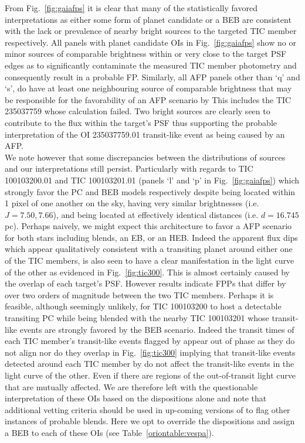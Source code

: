 From Fig.~\ref{fig:gaiafps} it is clear that many of the statistically favored interpretations as either 
some form of planet candidate or a BEB are consistent with the lack or prevalence of nearby bright sources
to the targeted TIC member respectively.
All panels with planet candidate OIs in Fig.~\ref{fig:gaiafps} show no
or minor sources of comparable brightness within or very close to the target PSF edges as to significantly
contaminate the measured TIC member photometry and consequently result in a probable FP.
Similarly, all AFP panels other than `q' and `s',
do have at least one neighbouring source of comparable brightness that may be responsible
for the favorability of an AFP scenario by 
This includes the TIC 235037759 whose \vespa{} calculation failed.
Two bright sources are clearly seen to contribute to the flux within the target's PSF thus supporting the
probable interpretation of the OI 235037759.01 transit-like event as being caused by an AFP. \\

We note however that some discrepancies between the distributions of \gaia{} sources and our \vespa{}
interpretations still persist. Particularly with regards to TIC 100103200.01 and TIC 100103201.01 (panels `l'
and `p' in Fig.~\ref{fig:gaiafps}) which strongly favor the PC and BEB models respectively despite being
located within 1 \tess{} pixel of one another on the sky, having very
similar brightnesses (i.e. $J=7.50, 7.66$), and being located at effectively identical distances (i.e.
$d=16.745$ pc). %
Perhaps naively, we might expect this architecture to favor a AFP scenario for
both stars including blends, an EB, or an HEB. Indeed the apparent flux dips which appear qualitatively
consistent with a transiting planet around either one of the TIC members, is also seen to have a clear manifestation
in the light curve of the other as evidenced in Fig.~\ref{fig:tic300}. This is almost certainly caused by the
overlap of each target's PSF.
However \vespa{} results indicate FPPs that differ by over two orders of magnitude between the two TIC members.
Perhaps it is feasible, although seemingly unlikely, for TIC 100103200 to host a detectable transiting
PC while being blended with the nearby TIC 100103201 whose transit-like events are strongly favored by the
BEB scenario. Indeed the transit times of each TIC member's transit-like events flagged by \pipeline{} appear out of
phase as they do not align nor do they overlap in Fig.~\ref{fig:tic300} implying that transit-like events detected
around each TIC member by \pipeline{} do not affect the transit-like events in the light curve of the other. Even if
there are regions of the out-of-transit light curve that are mutually affected.
We are therefore left with the questionable interpretation
of these OIs based on the \vespa{} dispositions alone and note that additional vetting criteria should be used in
up-coming versions of \pipeline{} to flag other instances of probable blends. Here we opt to override the \vespa{}
dispositions and assign a BEB to each of these OIs (see Table~\ref{oriontable:vespa}). \\


